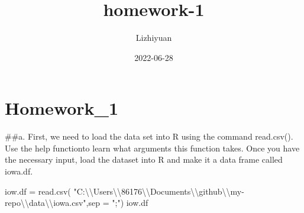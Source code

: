 \documentclass[
]{article}
\title{homework-1}
\author{Lizhiyuan}
\date{2022-06-28}
\newenvironment{Shaded}{\begin{snugshade}}{\end{snugshade}}
\newcommand{\AttributeTok}[1]{\textcolor[rgb]{0.77,0.63,0.00}{#1}}
\newcommand{\FunctionTok}[1]{\textcolor[rgb]{0.00,0.00,0.00}{#1}}
\newcommand{\NormalTok}[1]{#1}
\newcommand{\OtherTok}[1]{\textcolor[rgb]{0.56,0.35,0.01}{#1}}
\newcommand{\SpecialCharTok}[1]{\textcolor[rgb]{0.00,0.00,0.00}{#1}}
\newcommand{\StringTok}[1]{\textcolor[rgb]{0.31,0.60,0.02}{#1}}
\begin{document}
\maketitle

\hypertarget{homework_1}{%
\section{Homework\_1}\label{homework_1}}

\#\#a. First, we need to load the data set into R using the command
read.csv(). Use the help functionto learn what arguments this function
takes. Once you have the necessary input, load the dataset into R and
make it a data frame called iowa.df.

\begin{Shaded}
\begin{Highlighting}[]
\NormalTok{iow.df }\OtherTok{=} \FunctionTok{read.csv}\NormalTok{( }\StringTok{"C:}\SpecialCharTok{\textbackslash{}\textbackslash{}}\StringTok{Users}\SpecialCharTok{\textbackslash{}\textbackslash{}}\StringTok{86176}\SpecialCharTok{\textbackslash{}\textbackslash{}}\StringTok{Documents}\SpecialCharTok{\textbackslash{}\textbackslash{}}\StringTok{github}\SpecialCharTok{\textbackslash{}\textbackslash{}}\StringTok{my{-}repo}\SpecialCharTok{\textbackslash{}\textbackslash{}}\StringTok{data}\SpecialCharTok{\textbackslash{}\textbackslash{}}\StringTok{iowa.csv"}\NormalTok{,}\AttributeTok{sep =} \StringTok{";"}\NormalTok{)}
\NormalTok{iow.df}
\end{Highlighting}
\end{Shaded}
\end{document}
